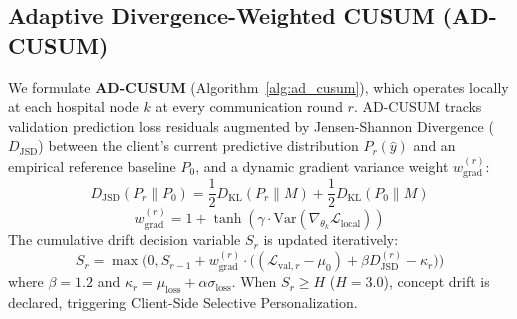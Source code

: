 \documentclass[final,5p,times,twocolumn]{elsarticle}
\begin{document}
\subsection{Adaptive Divergence-Weighted CUSUM (AD-CUSUM)}
We formulate \textbf{AD-CUSUM} (Algorithm~\ref{alg:ad_cusum}), which operates locally at each hospital node $k$ at every communication round $r$. AD-CUSUM tracks validation prediction loss residuals augmented by Jensen-Shannon Divergence ($D_{\text{JSD}}$) between the client's current predictive distribution $P_r(\hat{y})$ and an empirical reference baseline $P_0$, and a dynamic gradient variance weight $w_{\text{grad}}^{(r)}$:
\begin{equation}
D_{\text{JSD}}(P_r \parallel P_0) = \frac{1}{2} D_{\text{KL}}(P_r \parallel M) + \frac{1}{2} D_{\text{KL}}(P_0 \parallel M)
\end{equation}
\begin{equation}
w_{\text{grad}}^{(r)} = 1 + \tanh\left(\gamma \cdot \text{Var}\left(\nabla_{\theta_k} \mathcal{L}_{\text{local}}\right)\right)
\end{equation}
The cumulative drift decision variable $S_r$ is updated iteratively:
\begin{equation}
S_r = \max\Big(0, S_{r-1} + w_{\text{grad}}^{(r)} \cdot \big((\mathcal{L}_{\text{val}, r} - \mu_0) + \beta D_{\text{JSD}}^{(r)} - \kappa_r\big)\Big)
\end{equation}
where $\beta = 1.2$ and $\kappa_r = \mu_{\text{loss}} + \alpha \sigma_{\text{loss}}$. When $S_r \ge H$ ($H = 3.0$), concept drift is declared, triggering Client-Side Selective Personalization.
\end{document}
